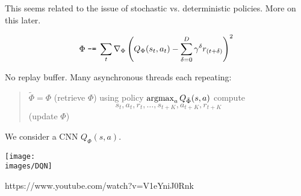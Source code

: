 {\vfill
This seems related to the issue of stochastic vs. deterministic policies.  More on this later.


$$\Phi \;\mbox{\tt -=} \;\sum_t \nabla_\Phi \left(Q_\Phi(s_t,a_t) - \sum_{\delta = 0}^{D} \gamma^\delta r_{(t+\delta)}\right)^2$$

No replay buffer.
Many asynchronous threads each repeating:
\vfill

  \begin{quotation}
  \noindent $\tilde{\Phi} = \Phi$ (retrieve $\Phi$)\newline \newline
  \noindent using policy $\operatorname*{argmax}_a Q_{\tilde{\Phi}}(s,a)$ compute $$s_t,a_t,r_t,\ldots,s_{t+K},a_{t+K},r_{t+K}$$
  \newline
   (update $\Phi$)
  \end{quotation}

\vfill
We consider a CNN $Q_\Phi(s,a)$.

\vfill
\centerline{\texttt{[image: \\images/DQN]}}


https://www.youtube.com/watch?v=V1eYniJ0Rnk


}



